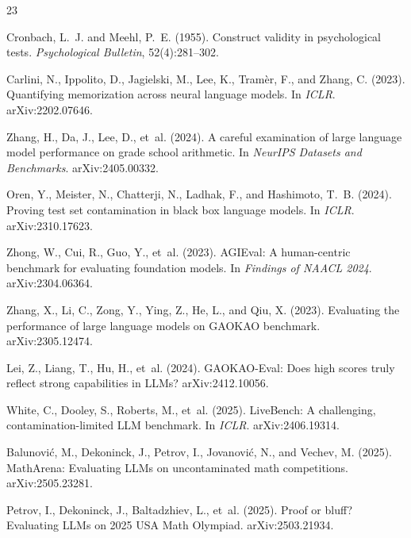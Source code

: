 \documentclass[11pt]{article}
\theoremstyle{plain}
\begin{document}
\begin{thebibliography}{23}
\small\setlength{\itemsep}{2pt}

Cronbach, L.~J. and Meehl, P.~E. (1955). Construct validity in
psychological tests. \emph{Psychological Bulletin}, 52(4):281--302.

Carlini, N., Ippolito, D., Jagielski, M., Lee, K., Tram\`er, F., and
Zhang, C. (2023). Quantifying memorization across neural language models.
In \emph{ICLR}. arXiv:2202.07646.

Zhang, H., Da, J., Lee, D., et~al. (2024). A careful examination of
large language model performance on grade school arithmetic. In
\emph{NeurIPS Datasets and Benchmarks}. arXiv:2405.00332.

Oren, Y., Meister, N., Chatterji, N., Ladhak, F., and Hashimoto, T.~B.
(2024). Proving test set contamination in black box language models. In
\emph{ICLR}. arXiv:2310.17623.

Zhong, W., Cui, R., Guo, Y., et~al. (2023). {AGIEval}: A human-centric
benchmark for evaluating foundation models. In \emph{Findings of NAACL
2024}. arXiv:2304.06364.

Zhang, X., Li, C., Zong, Y., Ying, Z., He, L., and Qiu, X. (2023).
Evaluating the performance of large language models on {GAOKAO}
benchmark. arXiv:2305.12474.

Lei, Z., Liang, T., Hu, H., et~al. (2024). {GAOKAO-Eval}: Does high
scores truly reflect strong capabilities in {LLMs}? arXiv:2412.10056.

White, C., Dooley, S., Roberts, M., et~al. (2025). {LiveBench}: A
challenging, contamination-limited {LLM} benchmark. In \emph{ICLR}.
arXiv:2406.19314.

Balunovi\'c, M., Dekoninck, J., Petrov, I., Jovanovi\'c, N., and
Vechev, M. (2025). {MathArena}: Evaluating {LLMs} on uncontaminated math
competitions. arXiv:2505.23281.

Petrov, I., Dekoninck, J., Baltadzhiev, L., et~al. (2025). Proof or
bluff? {Evaluating} {LLMs} on 2025 {USA} {Math} {Olympiad}.
arXiv:2503.21934.


\end{thebibliography}
\end{document}
